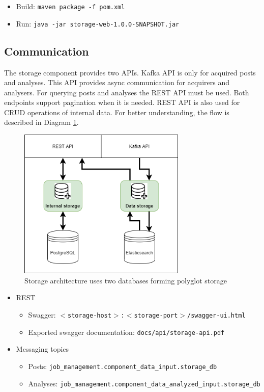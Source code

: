 \begin{itemize}
    \item Build: \texttt{maven package -f pom.xml}
    \item Run: \texttt{java -jar storage-web-1.0.0-SNAPSHOT.jar}
\end{itemize}

\subsection{Communication}\label{subsection:storage-communication}

The storage component provides two APIs. Kafka API is only for acquired posts and analyses. This API provides async communication for acquirers and analysers. For querying posts and analyses the REST API must be used. Both endpoints support pagination when it is needed. REST API is also used for CRUD operations of internal data. For better understanding, the flow is described in Diagram \ref{figure:storage}.

\begin{figure}[H]
\centering
\includegraphics[width=8cm]{diagrams/socneto-storage.png}
\caption{Storage architecture uses two databases forming polyglot storage}
\label{figure:storage}
\end{figure}

\begin{itemize}
    \item REST
        \begin{itemize}
            \item Swagger: \texttt{$<$storage-host$>$:$<$storage-port$>$/swagger-ui.html}
            \item Exported swagger documentation: \texttt{docs/api/storage-api.pdf}
        \end{itemize}
    \item Messaging topics
        \begin{itemize}
            \item Posts:
            \texttt{job\_management.component\_data\_input.storage\_db}
            \item Analyses:
            \texttt{job\_management.component\_data\_analyzed\_input.storage\_db}
        \end{itemize}
\end{itemize}
